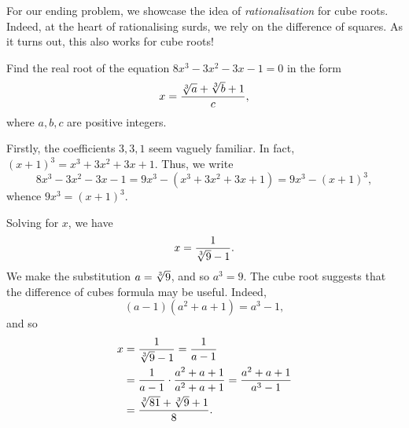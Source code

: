\documentclass[../jarvis.tex]{subfiles}
\begin{document}
For our ending problem, we showcase the idea of \textit{rationalisation} for cube roots. Indeed, at the heart of rationalising surds, we rely on the difference of squares. As it turns out, this also works for cube roots! 
\begin{example}[2013 AIME II/5]
    Find the real root of the equation $8x^3-3x^2-3x-1=0$ in the form 
    $$x=\frac{\sqrt[3]{a}+\sqrt[3]{b}+1}{c},$$
    where $a,b,c$ are positive integers.
\end{example}
Firstly, the coefficients $3, 3, 1$ seem vaguely familiar. In fact, $(x+1)^3=x^3+3x^2+3x+1$. Thus, we write
$$8x^3-3x^2-3x-1=9x^3-(x^3+3x^2+3x+1)=9x^3-(x+1)^3,$$
whence $9x^3=(x+1)^3$.

Solving for $x$, we have $$x=\frac{1}{\sqrt[3]{9}-1}.$$ We make the substitution $a=\sqrt[3]{9}$, and so $a^3=9$. The cube root suggests that the difference of cubes formula may be useful. Indeed, $$(a-1)(a^2+a+1)=a^3-1,$$ and so
\begin{align*}
    x&=\frac{1}{\sqrt[3]{9}-1}=\frac{1}{a-1} \\
    &=\frac{1}{a-1}\cdot \frac{a^2+a+1}{a^2+a+1}=\frac{a^2+a+1}{a^3-1} \\
    &=\frac{\sqrt[3]{81}+\sqrt[3]{9}+1}{8}.
\end{align*}
\end{document}
